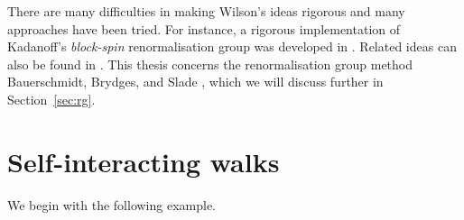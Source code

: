 There are many difficulties in making Wilson's ideas rigorous and many approaches
have been tried. For instance, a rigorous implementation of Kadanoff's \emph{block-spin}
renormalisation group was developed in \cite{GK85}. Related ideas can also be found in
\cite{GJ87,FMRS87}. This thesis concerns the renormalisation group method Bauerschmidt,
Brydges, and Slade \cite{BS-rg-norm,BS-rg-loc,BBS-rg-pt,BS-rg-IE,BS-rg-step}, which we
will discuss further in Section~\ref{sec:rg}.

\begin{example}
\end{example}



\section{Self-interacting walks}
\label{sec:walks}




We begin with the following example.

